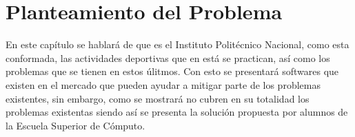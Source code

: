 \chapter{Planteamiento del Problema}
\noindent En este capítulo se hablará de que es el Instituto Politécnico Nacional, como esta conformada, las actividades deportivas que en está se practican, así como los problemas que se tienen en estos úlitmos.
Con esto se presentará softwares que existen en el mercado que pueden ayudar a mitigar parte de los problemas existentes, sin embargo, como se mostrará no cubren en su totalidad los problemas existentas siendo así se presenta la solución propuesta por alumnos de la Escuela Superior de Cómputo.

